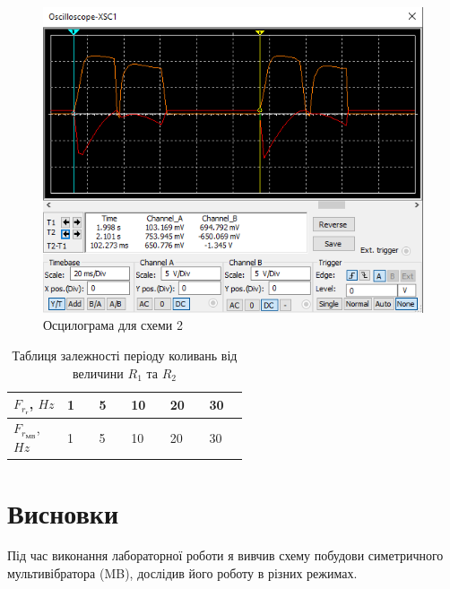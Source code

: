 \documentclass{article}
\begin{document}
\begin{normalsize}
	\begin{figure}[H]
		\centering
		\includegraphics[width=\textwidth]{4}
		\caption{Осцилограма для схеми 2}
	\end{figure}
	
	\begin{table}[H]
		\centering
		\renewcommand*\arraystretch{1.3}
		\begin{tabular}{|p{0.12\linewidth}|p{0.08\linewidth}|p{0.08\linewidth}|p{0.08\linewidth}|p{0.08\linewidth}|p{0.08\linewidth}|}
			\hline
			$F_{r_{\text{г}}}$, $Hz$&1&5&10&20&30\\
			\hline
			$F_{r_{\text{МВ}}}$, $Hz$&1&5&10&20&30\\
			\hline
		\end{tabular}
		\caption{Таблиця залежності періоду коливань від величини $R_1$ та $R_2$}
	\end{table}
	
	\section*{Висновки}
	Під час виконання лабораторної роботи я вивчив схему побудови симетричного мультивібратора
	(MB), дослідив його роботу в різних режимах.
	    
\end{normalsize}
\end{document}
